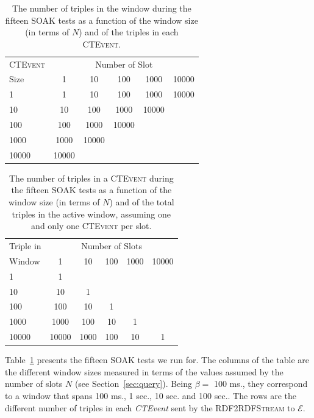\begin{table}[htb]
\centering
\small
 \begin{tabular}{l| ccccc}
	  	\hline
		\textsc{CTEvent}  &\multicolumn{5}{c}{Number of Slot}  \\
		Size  & 1 & 10 & 100 & 1000&10000 \\
		\hline	
		1 & 1& 10 & 100 & 1000&10000 \\
		10  & 10 & 100 & 1000&10000 \\
		100 & 100&1000&10000  \\
		1000 &1000 & 10000 \\
		10000&10000  \\
		\hline 
	\end{tabular}
	 \vspace{10pt}
	\caption[SOAK Tests Summary Table]{The number of triples in the window during the fifteen SOAK tests as a function of the window size (in terms of $N$) and of the triples in each \textsc{CTEvent}.}
	\label{tab:soaktests}
\end{table}

\begin{table}[htb]
	\centering
	\small
	\begin{tabular}{l | ccccc} %
	  	\hline
		Triple in & \multicolumn{5}{c}{Number of Slots}  \\
		Window  & 1 & 10 & 100 & 1000&10000\\
		\hline
		1  	 & 1\\
		10   & 10  & 1 \\
		100  & 100 & 10 & 1\\
		1000 & 1000& 100& 10& 1\\
		10000& 10000 & 1000& 100& 10& 1\\
		\hline %
	 \end{tabular}
	\caption[SOAK Tests Summary Table Alternative Layout]{The number of triples in a \textsc{CTEvent} during the fifteen SOAK tests as a function of the window size (in terms of $N$) and of the total triples in the active window, assuming one and only one \textsc{CTEvent} per slot.}
	\label{tab:soaktests-alt}
\end{table}

Table~\ref{tab:soaktests} presents the fifteen SOAK tests we run for. The columns of the table are the different window sizes measured in terms of the values assumed by the number of slots $N$ (see Section~\ref{sec:query}).  Being $\beta=$ 100 ms., they correspond to a window that spans 100 ms., 1 sec., 10 sec. and 100 sec.. The rows are the different number of triples in each \textit{CTEvent} sent by the \textsc{RDF2RDFStream} to $\mathcal{E}$.%

